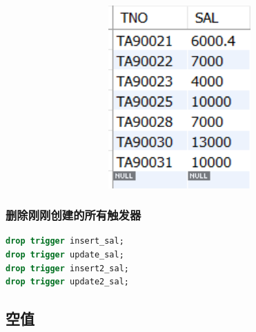 \documentclass{ctexart}
\begin{document}
			\begin{figure}[H]
				\centering 
				\includegraphics[height=7cm,width=14cm]{57.png}
				\end{figure}
\subsubsection{删除刚刚创建的所有触发器}
\begin{lstlisting}[language=sql]
drop trigger insert_sal;
drop trigger update_sal;
drop trigger insert2_sal;
drop trigger update2_sal;

\end{lstlisting}
\subsection{空值}
\end{document}
